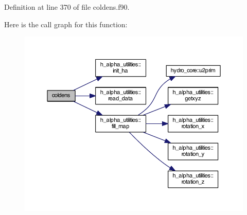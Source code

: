 Definition at line 370 of file coldens.\+f90.



Here is the call graph for this function\+:\nopagebreak
\begin{figure}[H]
\begin{center}
\leavevmode
\includegraphics[width=350pt]{coldens_8f90_afefbded5281bf1a352bcda7a729b23a6_cgraph}
\end{center}
\end{figure}


